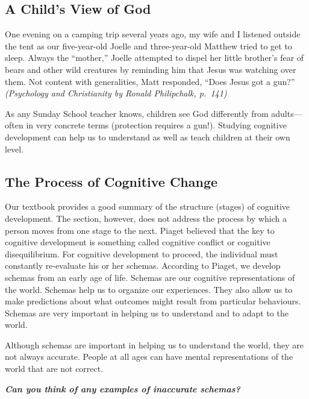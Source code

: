 \documentclass[
]{book}
\begin{document}
\hypertarget{a-childs-view-of-god}{%
\subsection*{A Child's View of God}\label{a-childs-view-of-god}}

One evening on a camping trip several years ago, my wife and I listened outside the tent as our five-year-old Joelle and three-year-old Matthew tried to get to sleep. Always the ``mother,'' Joelle attempted to dispel her little brother's fear of bears and other wild creatures by reminding him that Jesus was watching over them. Not content with generalities, Matt responded, ``Does Jesus got a gun?'' \emph{(Psychology and Christianity by Ronald Philipchalk, p.~141)}

As any Sunday School teacher knows, children see God differently from adults---often in very concrete terms (protection requires a gun!). Studying cognitive development can help us to understand as well as teach children at their own level.

\hypertarget{the-process-of-cognitive-change}{%
\subsection*{The Process of Cognitive Change}\label{the-process-of-cognitive-change}}

Our textbook provides a good summary of the structure (stages) of cognitive development. The section, however, does not address the process by which a person moves from one stage to the next. Piaget believed that the key to cognitive development is something called cognitive conflict or cognitive disequilibrium. For cognitive development to proceed, the individual must constantly re-evaluate his or her schemas. According to Piaget, we develop schemas from an early age of life. Schemas are our cognitive representations of the world. Schemas help us to organize our experiences. They also allow us to make predictions about what outcomes might result from particular behaviours. Schemas are very important in helping us to understand and to adapt to the world.

Although schemas are important in helping us to understand the world, they are not always accurate. People at all ages can have mental representations of the world that are not correct.

\textbf{\emph{Can you think of any examples of inaccurate schemas?}}
\end{document}
